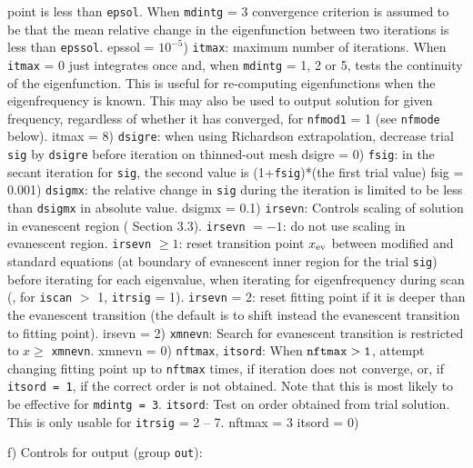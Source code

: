 point is less than {\tt epsol}.
When {\tt mdintg} = 3 convergence criterion
is assumed to be that the mean relative
change in the eigenfunction between two iterations is less than {\tt epssol}.
{ epssol = $10^{-5}$})
\param
{\tt itmax}: maximum number of iterations.
\pparam
When {\tt itmax} = 0 just integrates once and, when {\tt mdintg} = 1, 2 or 5,
tests the continuity of the eigenfunction. This is useful
for re-computing eigenfunctions when the eigenfrequency is known.
This may also be used to output solution for given frequency, regardless
of whether it has converged, for {\tt nfmod1} = 1 (see {\tt nfmode} below).
{ itmax = 8})
\param
{\tt dsigre}: 
when using Richardson extrapolation, decrease trial
{\tt sig} by {\tt dsigre} before iteration on thinned-out mesh
{ dsigre = 0})
\param
{\tt fsig}: in the secant iteration for {\tt sig}, the second value is
 (1+{\tt fsig})*(the first trial value)
{ fsig = 0.001})
\param
{\tt dsigmx}: the relative change in {\tt sig} during the iteration is limited
to be less than {\tt dsigmx} in absolute value.
{ dsigmx = 0.1})
\param
{\tt irsevn}: Controls scaling of solution in evanescent region
({\cf} Section 3.3).
\pparam
{\tt irsevn} $= -1$: do not use scaling in evanescent region.
\pparam
{\tt irsevn} $\ge 1$: reset transition
point $x_{\rm ev}$ between modified and standard equations (at boundary
of evanescent inner region for the trial {\tt sig}) before iterating 
for each eigenvalue,
when iterating for eigenfrequency during
scan ({\ie}, for {\tt iscan} $>$ 1, {\tt itrsig} = 1).
\pparam
{\tt irsevn} = 2:
reset fitting point if it is deeper
than the evanescent transition (the default is to shift
instead the evanescent transition to fitting point).
{ irsevn = 2})
\param
{\tt xmnevn}: Search for evanescent transition is restricted to
$x \ge$ {\tt xmnevn}.
{ xmnevn = 0})
\param
{\tt nftmax}, {\tt itsord}: 
When ${\tt nftmax > 1}$, attempt changing fitting
point up to {\tt nftmax} times, if iteration does not converge,
or, if {\tt itsord = 1}, if the correct order is not obtained.
Note that this is most likely to be effective for {\tt mdintg = 3}.
\pparam
{\tt itsord}: Test on order obtained from trial solution.
This is only usable for {\tt itrsig} = 2 -- 7.
{ nftmax = 3
itsord = 0})

\subsect
f) Controls for output (group {\tt out}):

